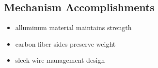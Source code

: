 





\subsection*{Mechanism Accomplishments}
\begin{itemize}
    \item alluminum material maintains strength
    \item carbon fiber sides preserve weight
    \item sleek wire management design 
  
\end{itemize} 
